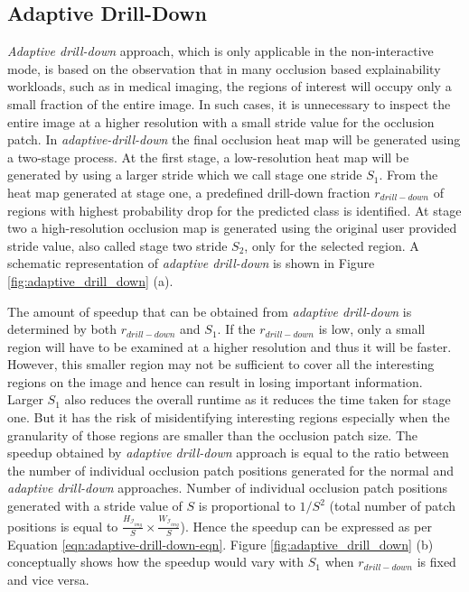 \subsection{Adaptive Drill-Down}\label{sec:ada-drill-down}
\textit{Adaptive drill-down} approach, which is only applicable in the non-interactive mode, is based on the observation that in many occlusion based explainability workloads, such as in medical imaging, the regions of interest will occupy only a small fraction of the entire image.
In such cases, it is unnecessary to inspect the entire image at a higher resolution with a small stride value for the occlusion patch.
In \textit{adaptive-drill-down} the final occlusion heat map will be generated using a two-stage process.
At the first stage, a low-resolution heat map will be generated by using a larger stride which we call stage one stride $S_1$.
From the heat map generated at stage one, a predefined drill-down fraction $r_{drill-down}$ of regions with highest probability drop for the predicted class is identified.
At stage two a high-resolution occlusion map is generated using the original user provided stride value, also called stage two stride $S_2$, only for the selected region.
A schematic representation of \textit{adaptive drill-down} is shown in Figure \ref{fig:adaptive_drill_down} (a).


The amount of speedup that can be obtained from \textit{adaptive drill-down} is determined by both $r_{drill-down}$ and $S_1$.
If the $r_{drill-down}$ is low, only a small region will have to be examined at a higher resolution and thus it will be faster.
However, this smaller region may not be sufficient to cover all the interesting regions on the image and hence can result in losing important information.
Larger $S_1$ also reduces the overall runtime as it reduces the time taken for stage one.
But it has the risk of misidentifying interesting regions especially when the granularity of those regions are smaller than the occlusion patch size.
The speedup obtained by \textit{adaptive drill-down} approach is equal to the ratio between the number of individual occlusion patch positions generated for the normal and \textit{adaptive drill-down} approaches.
Number of individual occlusion patch positions generated with a stride value of $S$ is proportional to $1/S^2$ (total number of patch positions is equal to $\frac{H_{\mathcal{I}_{img}}}{S} \times \frac{W_{\mathcal{I}_{img}}}{S}$).
Hence the speedup can  be expressed as per Equation \ref{eqn:adaptive-drill-down-eqn}.
Figure \ref{fig:adaptive_drill_down} (b) conceptually shows how the speedup would vary with $S_1$ when $r_{drill-down}$ is fixed and vice versa.

